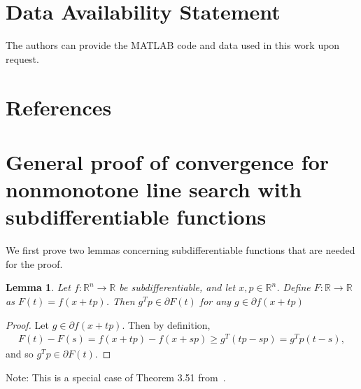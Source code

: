 \documentclass[]{interact}
\theoremstyle{plain}%
\newtheorem{lemma}[theorem]{Lemma}
\theoremstyle{definition}
\theoremstyle{remark}
\begin{document}
\section*{Data Availability Statement}
{The authors can provide the MATLAB code and data used in this work upon request.}


%
%
%
%
%


\section{References}






\appendix

\section{General proof of convergence for nonmonotone line search with subdifferentiable functions}\label{A:proof}

We first prove two lemmas concerning subdifferentiable functions that are needed for the proof.

\begin{lemma}\label{L:lemma1} Let $f: \mathbb{R}^n \to \mathbb{R}$ be subdifferentiable, and let $x, p \in \mathbb{R}^n$. Define $F:\mathbb{R} \to \mathbb{R}$ as $F(t) = f(x+tp)$. Then $g^Tp \in \partial{F}(t)$ for any $g \in \partial f (x+tp)$
\end{lemma}
\begin{proof}Let $g \in \partial f(x + t p)$. Then by definition,
\begin{align*}
F(t) - F(s) = f(x + tp) - f(x+sp) \geq g^T(tp - sp) = g^Tp (t -s),
\end{align*}
and so $g^Tp \in \partial F(t)$. 
\end{proof}
Note: This is a special case of Theorem 3.51 from~\cite{Nguyen}.
\end{document}
